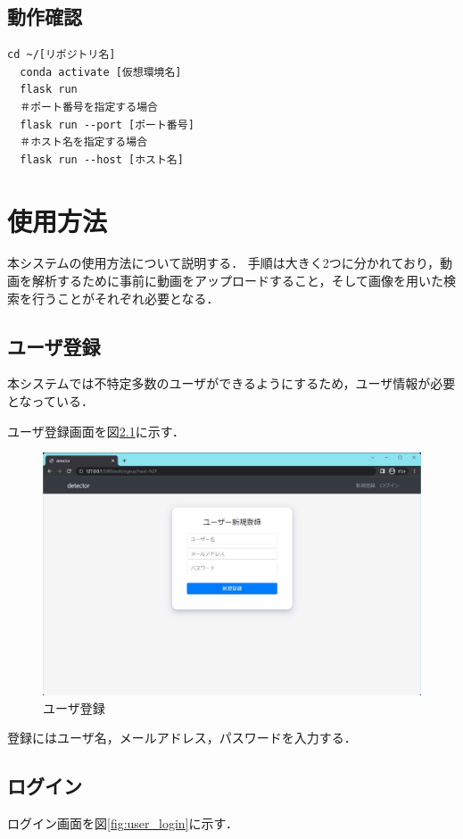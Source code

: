 \documentclass[a4j,12pt,dvipdfmx]{jreport}
\begin{document}
\section{動作確認}
\begin{lstlisting}[caption=hoge,label=fuga]
  cd ~/[リポジトリ名]
  conda activate [仮想環境名]
  flask run
  ＃ポート番号を指定する場合
  flask run --port [ポート番号]
  ＃ホスト名を指定する場合
  flask run --host [ホスト名]
\end{lstlisting}

\chapter{使用方法}
\label{sec:usage}
本システムの使用方法について説明する．
手順は大きく2つに分かれており，動画を解析するために事前に動画をアップロードすること，そして画像を用いた検索を行うことがそれぞれ必要となる．

\section{ユーザ登録}
本システムでは不特定多数のユーザができるようにするため，ユーザ情報が必要となっている．

ユーザ登録画面を図\ref{fig:user_register}に示す．

\begin{figure}[H]
  \centering
  \includegraphics[width=13cm]{image/user_register.jpg}
  \caption{ユーザ登録}
  \label{fig:user_register}
\end{figure}

登録にはユーザ名，メールアドレス，パスワードを入力する．

\section{ログイン}
ログイン画面を図\ref{fig:user_login}に示す．
\end{document}
